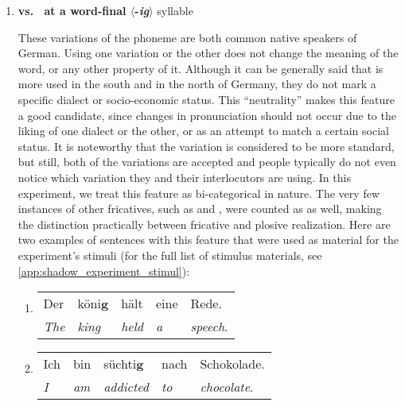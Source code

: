 \begin{enumerate}
	\item \textbf{\textipa{[\c{c}]} vs.\ \textipa{[k]} at a word-final $\langle$-\textit{ig}$\rangle$} syllable
	
	These variations of the phoneme \textipa{[\c{c}]} are both common native speakers of German.
	Using one variation or the other does not change the meaning of the word, or any other property of it.
	Although it can be generally said that \textipa{[\c{c}]} is more used in the south and \textipa{[k]} in the north of Germany, they do not mark a specific dialect or socio-economic status.
	This \enquote{neutrality} makes this feature a good candidate, since changes in pronunciation should not occur due to the liking of one dialect or the other, or as an attempt to match a certain social status.
	It is noteworthy that the \textipa{[\c{c}]} variation is considered to be more standard, but still, both of the variations are accepted and people typically do not even notice which variation they and their interlocutors are using.
	In this experiment, we treat this feature as bi-categorical in nature.
	The very few instances of other fricatives, such as \textipa{[S]} and \textipa{[J]}, were counted as \textipa{[\c{c}]} as well, making the distinction practically between fricative and plosive realization.
	Here are two examples of sentences with this feature that were used as material for the experiment's stimuli (for the full list of stimulus materials, see \autoref{app:shadow_experiment_stimul}):
	
	\begin{enumerate}[label=\arabic{enumi}\alph*), ref=\arabic{enumi}\alph*.)]
		\item 
		\begin{tabulary}{\linewidth}{LLLLL}
			Der				& köni\textbf{\underline{g}} & hält				& 	eine	& Rede.\\
			\textit{The}	& \textit{king} 			 & \textit{held}	& \emph{a}  & \emph{speech}.\\
		\end{tabulary}
		\item
		\begin{tabulary}{\linewidth}{LLLLL}
			Ich 		& bin		  & süchti\textbf{\underline{g}} & nach 		& Schokolade.\\
			\textit{I}  & \textit{am} & \textit{addicted} 			 & \textit{to}  & \textit{chocolate}.\\
		\end{tabulary}
	\end{enumerate}
	

\end{enumerate}
